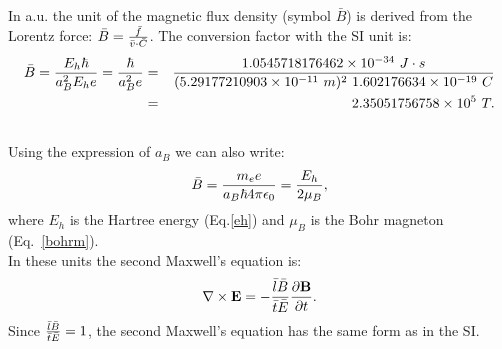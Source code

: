 \documentclass[12pt,a4paper]{article}
\def\hbarf{1.0545718176462\times 10^{-34}}
\def\barl{5.29177210903\times 10^{-11}}
\def\barc{1.602176634\times 10^{-19}}
\def\barb{2.35051756758\times 10^{5}}
\begin{document}
{\color{web-blue} In a.u. the unit of the magnetic flux density 
(symbol $\bar B$) is derived from the Lorentz force: 
$\bar B= {\bar f \over \bar v \cdot
\bar C}$. The conversion factor with the SI unit is:
\begin{eqnarray}
\bar B = {E_h \hbar \over a_B^2 E_h e}={\hbar \over a_B^2 e}&=&
{\hbarf\ J\cdot s \over (\barl\ m)^2\ \barc\ C}\nonumber
\\&=&\barb\ T.
\end{eqnarray}
\\

Using the expression of $a_B$ we can also write:
\begin{equation}
\bar B= {m_e e \over a_B \hbar 4 \pi \epsilon_0}=
{E_h \over 2 \mu_B},
\end{equation}
where $E_h$ is the Hartree energy (Eq.\ref{eh}) and $\mu_B$ is the Bohr 
magneton (Eq.~\ref{bohrm}).
\\
In these units the second Maxwell's equation is:
\begin{equation}
\nabla \times {\bf E}=-{\bar l \bar B \over \bar t \bar E} 
{\partial {\bf B} \over \partial t}.
\label{maxwell2gen}
\end{equation}
Since ${\bar l \bar B \over \bar t \bar E}=1$, the second Maxwell's
equation has the same form as in the SI.
}
\\
\end{document}
